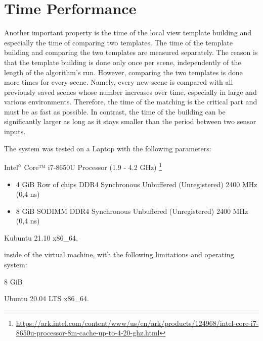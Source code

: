 \section{Time Performance}\label{section:timePerformance}

Another important property is the time of the local view template building and especially the time of comparing two templates. The time of the template building and comparing the two templates are measured separately. The reason is that the template building is done only once per scene, independently of the length of the algorithm's run. However, comparing the two templates is done more times for every scene. Namely, every new scene is compared with all previously saved scenes whose number increases over time, especially in large and various environments. Therefore, the time of the matching is the critical part and must be as fast as possible. In contrast, the time of the building can be significantly larger as long as it stays smaller than the period between two sensor inputs.\par
The system was tested on a Laptop with the following parameters:

\begin{description}[labelwidth=5em,leftmargin =\dimexpr\labelwidth+\labelsep\relax]
    \item[\textbf{Processor}:] Intel${}^{\text{\tiny{\textregistered}}}$ Core™ i7-8650U Processor (1.9 - 4.2 GHz) \footnote{\tiny{\url{https://ark.intel.com/content/www/us/en/ark/products/124968/intel-core-i7-8650u-processor-8m-cache-up-to-4-20-ghz.html}}}
    \item[\textbf{RAM}:]
          \begin{itemize}
              \item 4 GiB Row of chips DDR4 Synchronous Unbuffered (Unregistered) 2400 MHz (0,4 ns)
              \item 8 GiB SODIMM DDR4 Synchronous Unbuffered (Unregistered) 2400 MHz (0,4 ns)
          \end{itemize}
    \item[\textbf{OS}:] Kubuntu 21.10 x86\_64,
\end{description}

inside of the virtual machine, with the following limitations and operating system:

\begin{description}[labelwidth=5em]
    \item[\textbf{RAM}:] 8 GiB
    \item[\textbf{OS}:] Ubuntu 20.04 LTS x86\_64.
\end{description}


